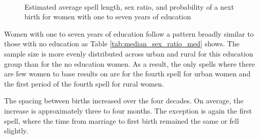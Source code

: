 \documentclass[12pt,letterpaper]{article}
\begin{document}
\begin{figure}[htpb]
\centering
{}
\\
\caption{Estimated average spell length, sex ratio, and probability of 
a next birth for women with one to seven years of education}
\label{fig:bootstrap_med}
\end{figure}





Women with one to seven years of education follow a pattern
broadly similar to those with no education as 
Table \ref{tab:median_sex_ratio_med} shows.
The sample size is more evenly distributed across urban and rural 
for this education group than for the no education women.
As a result, the only spells where there are few women to base 
results on are for the fourth spell for urban women and the first 
period of the fourth spell for rural women.

The spacing between births increased over the four decades.
On average, the increase is approximately three to four months.
The exception is again the first spell, where the time from
marriage to first birth remained the same or fell slightly.
\end{document}

